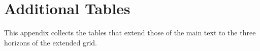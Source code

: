 
\chapter{Additional Tables}
\label{ch:appendix_tables}

This appendix collects the tables that extend those of the main text to the three horizons of the extended grid.





